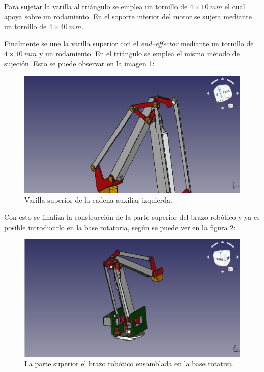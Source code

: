 Para sujetar la varilla al triángulo se emplea un tornillo de $4 \times 10~mm$ el cual apoya sobre un rodamiento. En el soporte inferior del motor se sujeta mediante un tornillo de $4 \times 40~mm$.

Finalmente se une la varilla superior con el \textit{end--effector} mediante un tornillo de $4 \times 10~mm$ y un rodamiento. En el triángulo se emplea el mismo método de sujeción. Esto se puede observar en la imagen \ref{fig:varilla_superior_izquierda}:

\begin{figure}[H]
    \centering 
    \includegraphics[width=1\linewidth]{pictures/VarillaSuperior.png}
    \caption{Varilla superior de la cadena auxiliar izquierda.}
    \label{fig:varilla_superior_izquierda}
\end{figure}

Con esto se finaliza la construcción de la parte superior del brazo robótico y ya es posible introducirlo en la base rotatoria, según se puede ver en la figura \ref{fig:parte_superio_ensamblada_base}:

\begin{figure}[H]
    \centering 
    \includegraphics[width=1\linewidth]{pictures/ParteSuperiorDelBrazoEnElSoporte.png}
    \caption{La parte superior el brazo robótico ensamblada en la base rotativa.}
    \label{fig:parte_superio_ensamblada_base}
\end{figure}

